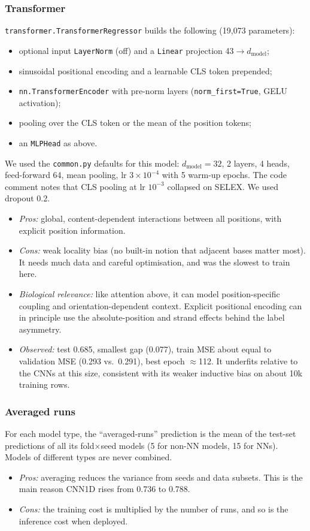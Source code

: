 \subsubsection{Transformer}
\texttt{transformer.TransformerRegressor} builds the following (19{,}073 parameters):
\begin{itemize}
\item optional input \texttt{LayerNorm} (off) and a \texttt{Linear} projection 43$\to d_\mathrm{model}$;
\item sinusoidal positional encoding and a learnable CLS token prepended;
\item \texttt{nn.TransformerEncoder} with pre-norm layers (\texttt{norm\_first=True}, GELU activation);
\item pooling over the CLS token or the mean of the position tokens;
\item an \texttt{MLPHead} as above.
\end{itemize}
We used the \texttt{common.py} defaults for this model: $d_\mathrm{model}=32$, 2 layers, 4 heads, feed-forward 64, mean pooling, lr $3\times10^{-4}$ with 5 warm-up epochs. The code comment notes that CLS pooling at lr $10^{-3}$ collapsed on SELEX. We used dropout 0.2.
\begin{itemize}
\item \emph{Pros:} global, content-dependent interactions between all positions, with explicit position information.
\item \emph{Cons:} weak locality bias (no built-in notion that adjacent bases matter most). It needs much data and careful optimisation, and was the slowest to train here.
\item \emph{Biological relevance:} like attention above, it can model position-specific coupling and orientation-dependent context. Explicit positional encoding can in principle use the absolute-position and strand effects behind the label asymmetry.
\item \emph{Observed:} test 0.685, smallest gap (0.077), train MSE about equal to validation MSE (0.293 vs.\ 0.291), best epoch $\approx$112. It underfits relative to the CNNs at this size, consistent with its weaker inductive bias on about 10k training rows.
\end{itemize}

\subsubsection{Averaged runs}
For each model type, the ``averaged-runs'' prediction is the mean of the test-set predictions of all its fold$\times$seed models (5 for non-NN models, 15 for NNs). Models of different types are never combined.
\begin{itemize}
\item \emph{Pros:} averaging reduces the variance from seeds and data subsets. This is the main reason CNN1D rises from 0.736 to 0.788.
\item \emph{Cons:} the training cost is multiplied by the number of runs, and so is the inference cost when deployed.
\end{itemize}

